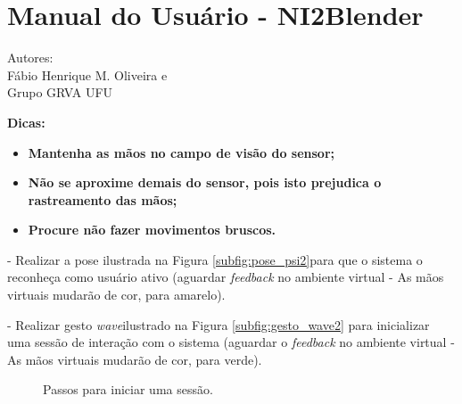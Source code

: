 \chapter{Manual do Usuário - NI2Blender}
\label{apendiceA}

\noindent Autores: \\
\indent Fábio Henrique M. Oliveira e \\
\indent Grupo GRVA UFU

 \noindent \textbf{Dicas:}
 \begin{itemize}
  \item \textbf{Mantenha as mãos no campo de visão do sensor;}
  \item \textbf{Não se aproxime demais do sensor, pois isto prejudica o rastreamento das mãos;}
  \item \textbf{Procure não fazer movimentos bruscos.}
 \end{itemize}

 - Realizar a pose ilustrada na Figura \ref{subfig:pose_psi2}\footnotemark[1] para que o sistema o reconheça como usuário ativo (aguardar \textit{feedback} no ambiente virtual - As mãos virtuais mudarão de cor, para amarelo).

 - Realizar gesto \textit{wave}\footnotemark[2] ilustrado na Figura \ref{subfig:gesto_wave2} para inicializar uma sessão de interação com o sistema (aguardar o \textit{feedback} no ambiente virtual - As mãos virtuais mudarão de cor, para verde).

\begin{figure}[!htbp]
 \centering
 \quad
 \quad 
 \caption{Passos para iniciar uma sessão.}
 \label{fig:iniciar_sessao2}
\end{figure}




